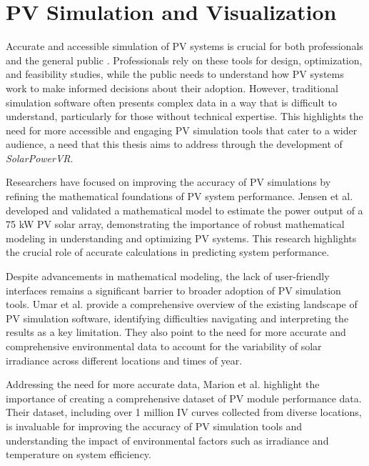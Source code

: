 \documentclass[draft, final]{vutinfth} %
\begin{document}
\section{PV Simulation and Visualization}

Accurate and accessible simulation of PV systems is crucial for both professionals and the general public \cite{Milosavljevic2022SimTools}. Professionals rely on these tools for design, optimization, and feasibility studies, while the public needs to understand how PV systems work to make informed decisions about their adoption. However, traditional simulation software often presents complex data in a way that is difficult to understand, particularly for those without technical expertise. This highlights the need for more accessible and engaging PV simulation tools that cater to a wider audience, a need that this thesis aims to address through the development of \textit{SolarPowerVR}.

Researchers have focused on improving the accuracy of PV simulations by refining the mathematical foundations of PV system performance. Jensen et al. \cite{Jensen2010Model} developed and validated a mathematical model to estimate the power output of a 75 kW PV solar array, demonstrating the importance of robust mathematical modeling in understanding and optimizing PV systems. This research highlights the crucial role of accurate calculations in predicting system performance.

Despite advancements in mathematical modeling, the lack of user-friendly interfaces remains a significant barrier to broader adoption of PV simulation tools. Umar et al. \cite{Umar2018PvSimSoftware} provide a comprehensive overview of the existing landscape of PV simulation software, identifying difficulties navigating and interpreting the results as a key limitation. They also point to the need for more accurate and comprehensive environmental data to account for the variability of solar irradiance across different locations and times of year.

Addressing the need for more accurate data, Marion et al. \cite{Marion2014PvData} highlight the importance of creating a comprehensive dataset of PV module performance data. Their dataset, including over 1 million IV curves collected from diverse locations, is invaluable for improving the accuracy of PV simulation tools and understanding the impact of environmental factors such as irradiance and temperature on system efficiency. 
\end{document}

